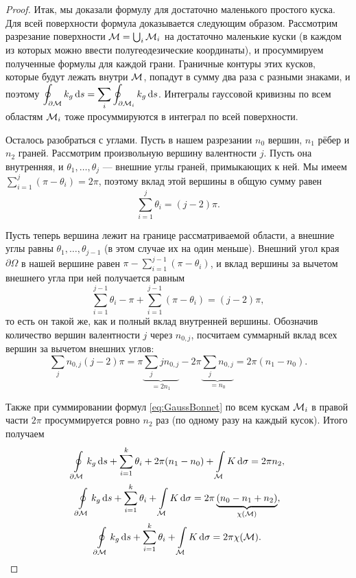 \begin{proof}
	Итак, мы доказали формулу для достаточно маленького простого куска. Для всей поверхности формула доказывается следующим образом. Рассмотрим разрезание поверхности $\mathcal{M} = \bigcup_i\mathcal{M}_i$ на достаточно маленькие куски (в каждом из которых можно ввести полугеодезические координаты), и просуммируем полученные формулы для каждой грани. Граничные контуры этих кусков, которые будут лежать внутри $\mathcal{M}$, попадут в сумму два раза с разными знаками, и поэтому $\displaystyle\oint_{\partial \mathcal{M}}k_g\mathop{}\!\mathrm{d} s = \sum_i\oint_{\partial \mathcal{M}_i}k_g\mathop{}\!\mathrm{d} s$. Интегралы гауссовой кривизны по всем областям $\mathcal{M}_i$ тоже просуммируются в интеграл по всей поверхности.

	Осталось разобраться с углами. Пусть в нашем разрезании $n_0$ вершин, $n_1$ рёбер и $n_2$ граней. Рассмотрим произвольную вершину валентности $j$. Пусть она внутренняя, и $\theta_1, \ldots, \theta_j$ --- внешние углы граней, примыкающих к ней. Мы имеем $\sum\limits_{i = 1}^j(\pi - \theta_i) = 2\pi$, поэтому вклад этой вершины в общую сумму равен
	\[
		\sum_{i = 1}^j\theta_i = (j - 2)\pi.
	\]

	Пусть теперь вершина лежит на границе рассматриваемой области, а внешние углы равны $\theta_1, \ldots, \theta_{j - 1}$ (в этом случае их на один меньше). Внешний угол края $\partial\Omega$ в нашей вершине равен $\pi - \sum\limits_{i = 1}^{j - 1}(\pi - \theta_i)$, и вклад вершины за вычетом внешнего угла при ней получается равным
	\[
		\sum_{i = 1}^{j - 1}\theta_i - \pi + \sum\limits_{i = 1}^{j - 1}(\pi - \theta_i) = (j - 2)\pi,
	\]
	то есть он такой же, как и полный вклад внутренней вершины. Обозначив количество вершин валентности $j$ через $n_{0, j}$, посчитаем суммарный вклад всех вершин за вычетом внешних углов:
	\[
		\sum_jn_{0, j}(j - 2)\pi = \pi{\underbrace{\sum_jjn_{0, j}}_{= 2n_1}} - 2\pi{\underbrace{\sum_jn_{0, j}}_{= n_0}} = 2\pi(n_1 - n_0).
	\]

	Также при суммировании формул \eqref{eq:GaussBonnet} по всем кускам $\mathcal{M}_i$ в правой части $2\pi$ просуммируется ровно $n_2$ раз (по одному разу на каждый кусок). Итого получаем
	\begin{gather*}
		\oint\limits_{\partial\mathcal{M}}k_g\mathop{}\!\mathrm{d} s + \sum_{i = 1}^k\theta_i + 2\pi(n_1 - n_0) + \int\limits_{\mathcal{M}}K\mathop{}\!\mathrm{d}\sigma = 2\pi n_2,\\
		\oint\limits_{\partial\mathcal{M}}k_g\mathop{}\!\mathrm{d} s + \sum_{i = 1}^k\theta_i + \int\limits_{\mathcal{M}}K\mathop{}\!\mathrm{d}\sigma = 2\pi\underbrace{(n_0 - n_1 + n_2)}_{\chi(\mathcal{M})},\\
		\oint\limits_{\partial\mathcal{M}}k_g\mathop{}\!\mathrm{d} s + \sum_{i = 1}^k\theta_i + \int\limits_{\mathcal{M}}K\mathop{}\!\mathrm{d}\sigma = 2\pi\chi(\mathcal{M}).
	\end{gather*}
\end{proof}

